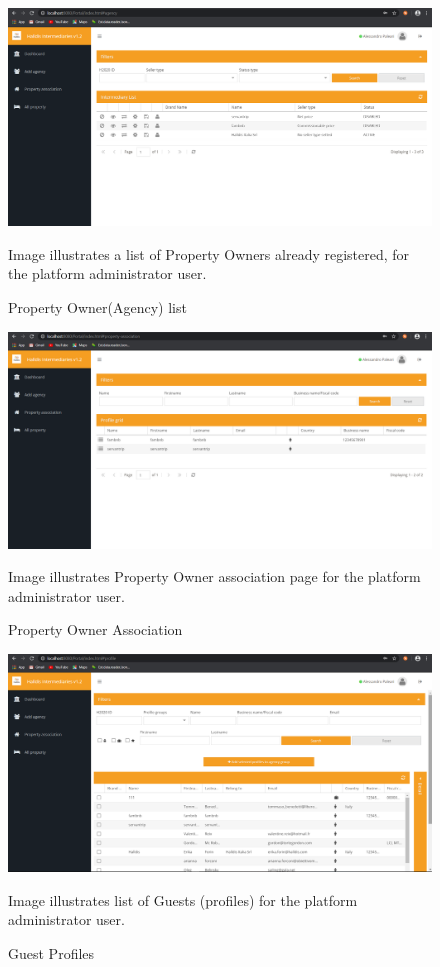 \begin{figure} 
\centering
\includegraphics[width=12cm]{pictures/screens/agency-list-platform-admin.png}
\caption{Property Owner(Agency) list}
Image illustrates a list of Property Owners already registered, for the platform administrator user.
\label{fig:agency_list_platform_admin_pic}
\end{figure}

\begin{figure} 
\centering
\includegraphics[width=12cm]{pictures/screens/agency-property-association-platform-admin.png}
\caption{Property Owner Association}
Image illustrates Property Owner association page for the platform administrator user.
\label{fig:agency_property_association_platform_admin_pic}
\end{figure}

\begin{figure} 
\centering
\includegraphics[width=12cm]{pictures/screens/profile-agency-platform-admin.png}
\caption{Guest Profiles}
Image illustrates list of Guests (profiles) for the platform administrator user.
\label{fig:profile_agency_platform_admin_pic}
\end{figure}

